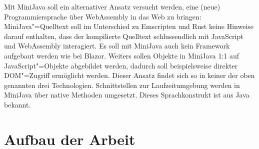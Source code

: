 Mit MiniJava soll ein alternativer Ansatz versucht werden, eine (neue) Programmiersprache über WebAssembly in das Web zu bringen: MiniJava"=Quelltext soll im Unterschied zu Emscripten und Rust keine Hinweise darauf enthalten, dass der kompilierte Quelltext schlussendlich mit JavaScript und WebAssembly interagiert. Es soll mit MiniJava auch kein Framework aufgebaut werden wie bei Blazor. Weiters sollen Objekte in MiniJava 1:1 auf JavaScript"=Objekte abgebildet werden, dadurch soll beispielsweise direkter DOM"=Zugriff ermöglicht werden. Dieser Ansatz findet sich so in keiner der oben genannten drei Technologien. Schnittstellen zur Laufzeitumgebung werden in MiniJava über native Methoden umgesetzt. Dieses Sprachkonstrukt ist aus Java bekannt.

\section{Aufbau der Arbeit}

